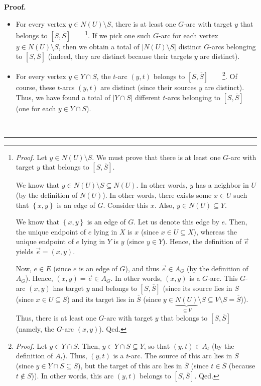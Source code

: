 \documentclass[numbers=enddot,12pt,final,onecolumn,notitlepage]{scrartcl}%
\theoremstyle{definition}
\newenvironment{proof}[1][Proof]{\noindent\textbf{#1.} }{\ \rule{0.5em}{0.5em}}
\begin{document}
\begin{proof}
\begin{itemize}
\item For every vertex $y\in N\left(  U\right)  \setminus S$, there is at
least one $G$-arc with target $y$ that belongs to $\left[  S,\overline
{S}\right]  $\ \ \ \ \footnote{\textit{Proof.} Let $y\in N\left(  U\right)
\setminus S$. We must prove that there is at least one $G$-arc with target $y$
that belongs to $\left[  S,\overline{S}\right]  $.
\par
We know that $y\in N\left(  U\right)  \setminus S\subseteq N\left(  U\right)
$. In other words, $y$ has a neighbor in $U$ (by the definition of $N\left(
U\right)  $). In other words, there exists some $x\in U$ such that $\left\{
x,y\right\}  $ is an edge of $G$. Consider this $x$. Also, $y\in N\left(
U\right)  \subseteq Y$.
\par
We know that $\left\{  x,y\right\}  $ is an edge of $G$. Let us denote this
edge by $e$. Then, the unique endpoint of $e$ lying in $X$ is $x$ (since $x\in
U\subseteq X$), whereas the unique endpoint of $e$ lying in $Y$ is $y$ (since
$y\in Y$). Hence, the definition of $\overrightarrow{e}$ yields
$\overrightarrow{e}=\left(  x,y\right)  $.
\par
Now, $e\in E$ (since $e$ is an edge of $G$), and thus $\overrightarrow{e}\in
A_{G}$ (by the definition of $A_{G}$). Hence, $\left(  x,y\right)
=\overrightarrow{e}\in A_{G}$. In other words, $\left(  x,y\right)  $ is a
$G$-arc. This $G$-arc $\left(  x,y\right)  $ has target $y$ and belongs to
$\left[  S,\overline{S}\right]  $ (since its source lies in $S$ (since $x\in
U\subseteq S$) and its target lies in $\overline{S}$ (since $y\in
\underbrace{N\left(  U\right)  }_{\subseteq V}\setminus S\subseteq V\setminus
S=\overline{S}$)). Thus, there is at least one $G$-arc with target $y$ that
belongs to $\left[  S,\overline{S}\right]  $ (namely, the $G$-arc $\left(
x,y\right)  $). Qed.}. If we pick one such $G$-arc for each vertex $y\in
N\left(  U\right)  \setminus S$, then we obtain a total of $\left\vert
N\left(  U\right)  \setminus S\right\vert $ distinct $G$-arcs belonging to
$\left[  S,\overline{S}\right]  $ (indeed, they are distinct because their
targets $y$ are distinct).

\item For every vertex $y\in Y\cap S$, the $t$-arc $\left(  y,t\right)  $
belongs to $\left[  S,\overline{S}\right]  $\ \ \ \ \footnote{\textit{Proof.}
Let $y\in Y\cap S$. Then, $y\in Y\cap S\subseteq Y$, so that $\left(
y,t\right)  \in A_{t}$ (by the definition of $A_{t}$). Thus, $\left(
y,t\right)  $ is a $t$-arc. The source of this arc lies in $S$ (since $y\in
Y\cap S\subseteq S$), but the target of this arc lies in $\overline{S}$ (since
$t\in\overline{S}$ (because $t\notin S$)). In other words, this arc $\left(
y,t\right)  $ belongs to $\left[  S,\overline{S}\right]  $. Qed.}. Of course,
these $t$-arcs $\left(  y,t\right)  $ are distinct (since their sources $y$
are distinct). Thus, we have found a total of $\left\vert Y\cap S\right\vert $
different $t$-arcs belonging to $\left[  S,\overline{S}\right]  $ (one for
each $y\in Y\cap S$).
\end{itemize}


\end{proof}
\end{document}
